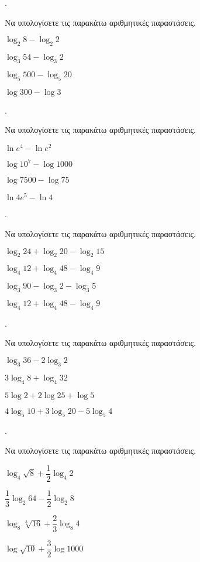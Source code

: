 \documentclass[11pt,a4paper,twocolumn]{article}
\newcounter{askhsh}
\newcommand{\askhsh}{\large\theaskhsh.\ \addtocounter{askhsh}{1}}
\begin{document}
\askhsh Να υπολογίσετε τις παρακάτω αριθμητικές παραστάσεις.
\begin{multicols}{2}
\begin{alist}
\item $ \log_{2}{8}-\log_{2}{2} $
\item $ \log_{3}{54}-\log_{3}{2} $
\item $ \log_{5}{500}-\log_{5}{20} $
\item $ \log{300}-\log{3} $
\end{alist}
\end{multicols}
\askhsh Να υπολογίσετε τις παρακάτω αριθμητικές παραστάσεις.
\begin{multicols}{2}
\begin{alist}
\item $ \ln{e^4}-\ln{e^2} $
\item $ \log{10^7}-\log{1000} $
\item $ \log{7500}-\log{75} $
\item $ \ln{4e^5}-\ln{4} $
\end{alist}
\end{multicols}
\askhsh Να υπολογίσετε τις παρακάτω αριθμητικές παραστάσεις.
\begin{alist}
\item $ \log_{2}{24}+\log_{2}{20}-\log_{2}{15} $
\item $ \log_{4}{12}+\log_{4}{48}-\log_{4}{9} $
\item $ \log_{3}{90}-\log_{3}{2}-\log_{3}{5} $
\item $ \log_{4}{12}+\log_{4}{48}-\log_{4}{9} $
\end{alist}
\askhsh Να υπολογίσετε τις παρακάτω αριθμητικές παραστάσεις.
\begin{alist}
\item $ \log_{3}{36}-2\log_{3}{2} $
\item $ 3\log_{4}{8}+\log_{4}{32} $
\item $ 5\log{2}+2\log{25}+\log{5} $
\item $ 4\log_{5}{10}+3\log_{5}{20}-5\log_{5}{4} $
\end{alist}
\askhsh Να υπολογίσετε τις παρακάτω αριθμητικές παραστάσεις.
\begin{alist}
\item $ \log_{4}{\sqrt{8}}+\dfrac{1}{2}\log_{4}{2} $
\item $ \dfrac{1}{3}\log_{2}{64}-
\dfrac{1}{2}\log_{2}{8} $
\item $ \log_{8}{\sqrt[3]{16}}+\dfrac{2}{3}\log_{8}{4} $
\item $ \log{\sqrt{10}}+\dfrac{3}{2}\log{1000} $
\end{alist}
\end{document}
